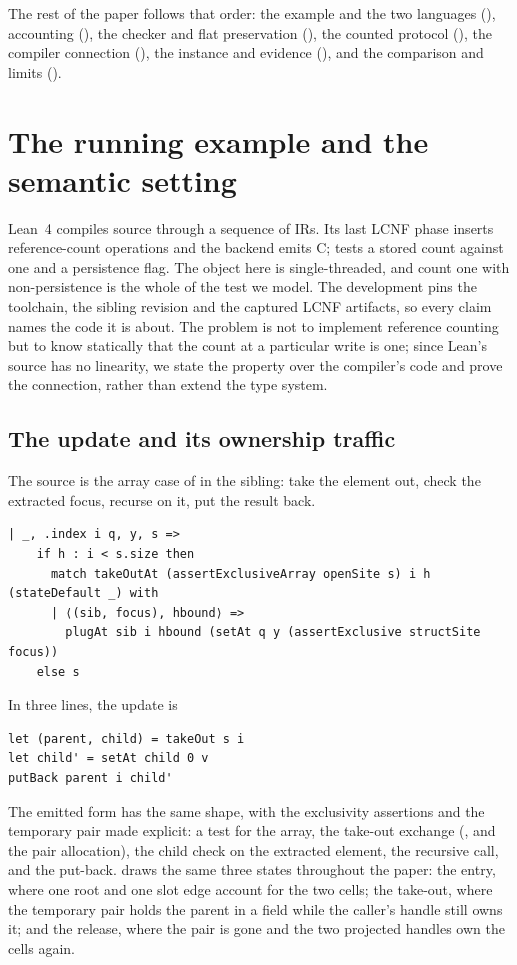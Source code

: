 \documentclass[a4paper,UKenglish,cleveref]{lipics-v2021}
\begin{document}
The rest of the paper follows that order: the example and the two languages
(), accounting (), the checker and flat
preservation (), the counted protocol (), the
compiler connection (), the instance and evidence
(), and the comparison and limits ().

\section{The running example and the semantic setting}\label{sec:setting}

Lean~4 compiles source through a sequence of IRs. Its last LCNF phase inserts
reference-count operations and the backend emits C; 
tests a stored count against one and a persistence flag. The object here is
single-threaded, and count one with non-persistence is the whole of the test we
model. The development pins the toolchain, the sibling revision and the captured
LCNF artifacts, so every claim names the code it is about. The problem is not to
implement reference counting but to know statically that the count at a particular
write is one; since Lean's source has no linearity, we state the property over the
compiler's code and prove the connection, rather than extend the type system.

\subsection{The update and its ownership traffic}\label{sec:example}
The source is the array case of  in the sibling: take the
element out, check the extracted focus, recurse on it, put the result back.
\begin{lstlisting}
| _, .index i q, y, s =>
    if h : i < s.size then
      match takeOutAt (assertExclusiveArray openSite s) i h (stateDefault _) with
      | ⟨(sib, focus), hbound⟩ =>
        plugAt sib i hbound (setAt q y (assertExclusive structSite focus))
    else s
\end{lstlisting}
In three lines, the update is
\begin{lstlisting}
let (parent, child) = takeOut s i
let child' = setAt child 0 v
putBack parent i child'
\end{lstlisting}
The emitted form has the same shape, with the exclusivity assertions and the
temporary pair made explicit: a 
test for the array, the take-out exchange (,
 and the pair allocation), the child check on the extracted
element, the recursive call, and the  put-back.
 draws the same three states throughout the paper: the entry,
where one root and one slot edge account for the two cells; the take-out, where
the temporary pair holds the parent in a field while the caller's handle still
owns it; and the release, where the pair is gone and the two projected handles own
the cells again.
\end{document}
